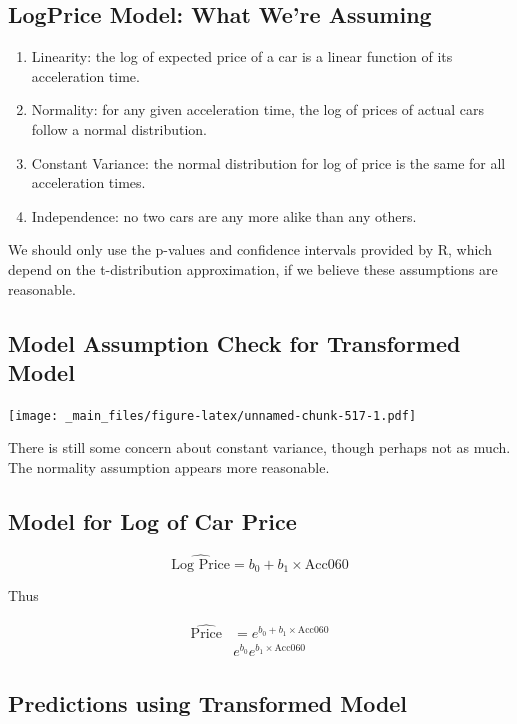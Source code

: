 \documentclass[]{book}
\begin{document}
\subsection{LogPrice Model: What We're
Assuming}\label{logprice-model-what-were-assuming}

\begin{enumerate}
\def\labelenumi{\arabic{enumi}.}
\item
  Linearity: the log of expected price of a car is a linear function of
  its acceleration time.
\item
  Normality: for any given acceleration time, the log of prices of
  actual cars follow a normal distribution.
\item
  Constant Variance: the normal distribution for log of price is the
  same for all acceleration times.
\item
  Independence: no two cars are any more alike than any others.
\end{enumerate}

We should only use the p-values and confidence intervals provided by R,
which depend on the t-distribution approximation, if we believe these
assumptions are reasonable.

\subsection{Model Assumption Check for Transformed
Model}\label{model-assumption-check-for-transformed-model}

\texttt{[image: \_main\_files/figure-latex/unnamed-chunk-517-1.pdf]}

There is still some concern about constant variance, though perhaps not
as much. The normality assumption appears more reasonable.

\subsection{Model for Log of Car
Price}\label{model-for-log-of-car-price}

\[
\widehat{\text{Log Price}} = b_0 + b_1\times \text{Acc060} 
\]

Thus

\[
\begin{aligned}
\widehat{\text{Price}} & = e^{b_0 + b_1\times \text{Acc060} } \\
 & e^{b_0}e^{b_1 \times \text{Acc060}}
\end{aligned}
\]

\subsection{Predictions using Transformed
Model}\label{predictions-using-transformed-model}
\end{document}
